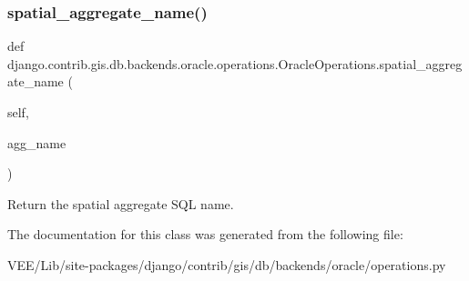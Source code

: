 \subsubsection{\texorpdfstring{spatial\+\_\+aggregate\+\_\+name()}{spatial\_aggregate\_name()}}
{\footnotesize\ttfamily def django.\+contrib.\+gis.\+db.\+backends.\+oracle.\+operations.\+Oracle\+Operations.\+spatial\+\_\+aggregate\+\_\+name (\begin{DoxyParamCaption}\item[{}]{self,  }\item[{}]{agg\+\_\+name }\end{DoxyParamCaption})}

\begin{DoxyVerb}Return the spatial aggregate SQL name.
\end{DoxyVerb}
 

The documentation for this class was generated from the following file\+:\begin{DoxyCompactItemize}
\item 
V\+E\+E/\+Lib/site-\/packages/django/contrib/gis/db/backends/oracle/operations.\+py\end{DoxyCompactItemize}
